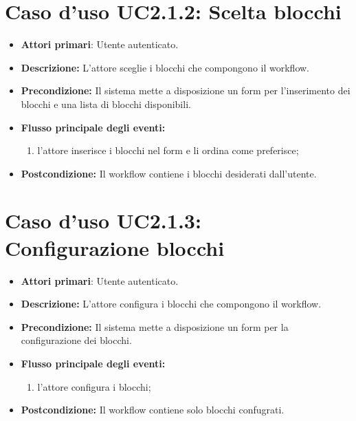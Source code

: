 		\section{Caso d'uso UC2.1.2: Scelta blocchi }
		\begin{itemize}
			\item \textbf{Attori primari}: Utente autenticato.
			\item \textbf{Descrizione:} L'attore sceglie i blocchi che compongono il workflow.
			\item \textbf{Precondizione:} Il sistema mette a disposizione un form per l'inserimento dei blocchi e una lista di blocchi disponibili.
			\item \textbf{Flusso principale degli eventi:}
			\begin{enumerate}
				\item l'attore inserisce i blocchi nel form e li ordina come preferisce;
			\end{enumerate}
			\item \textbf{Postcondizione:} Il workflow contiene i blocchi desiderati dall'utente.
		\end{itemize}
		\section{Caso d'uso UC2.1.3: Configurazione blocchi }
		\begin{itemize}
			\item \textbf{Attori primari}: Utente autenticato.
			\item \textbf{Descrizione:} L'attore configura i blocchi che compongono il workflow.
			\item \textbf{Precondizione:} Il sistema mette a disposizione un form per la configurazione dei blocchi.
			\item \textbf{Flusso principale degli eventi:}
			\begin{enumerate}
				\item l'attore configura i blocchi;
			\end{enumerate}
			\item \textbf{Postcondizione:} Il workflow contiene solo blocchi confugrati.
		\end{itemize}
